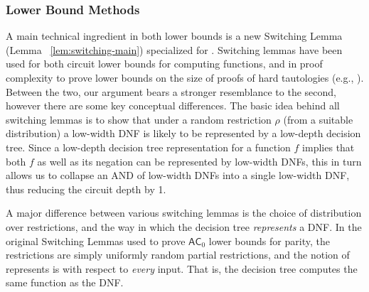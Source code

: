 \subsubsection{Lower Bound Methods}
 
A main technical ingredient in both lower bounds is a new Switching Lemma (Lemma ~\ref{lem:switching-main})  specialized for \avoid. 
Switching lemmas have been used for both circuit lower bounds for computing functions, and in proof complexity to prove lower bounds on the size of proofs of hard tautologies (e.g., \cite{beame-sl,razborov-sl,BeameIKPPW92}). Between the two, our argument bears a stronger resemblance to the second, however there are some key conceptual differences. 
The basic idea behind all switching lemmas is to show that under a random restriction $\rho$ (from a suitable distribution) a low-width DNF is likely to be represented by a low-depth decision tree. Since a low-depth decision tree representation for a function $f$ implies that both $f$ as well as its negation can be represented by low-width DNFs, this in turn allows us to collapse an AND of low-width DNFs into a single low-width DNF, thus reducing the circuit depth by 1.

A major difference between various switching lemmas is the choice of  distribution over restrictions, and the way in which the decision tree {\it represents} a DNF. In the original Switching Lemmas used to prove $\mathsf{AC}_0$ lower bounds for parity, the restrictions are simply uniformly random partial restrictions, and the notion of represents is with respect to {\it every} input. That is, the decision tree computes the same function as the DNF.


